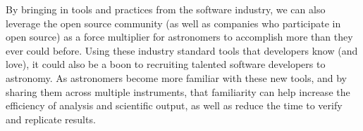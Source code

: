 \documentclass[11pt,twoside]{article}
\begin{document}
By bringing in tools and practices from the software industry, we can also
leverage the open source community (as well as companies who participate in
open source) as a force multiplier for astronomers to accomplish
more than they ever could before. Using these industry standard tools that
developers know (and love), it could also be a boon to recruiting talented
software developers to astronomy.  As astronomers become more familiar with
these new tools, and by sharing them across multiple instruments, that
familiarity can help increase the efficiency of analysis and scientific
output, as well as reduce the time to verify and replicate results.



\end{document}
